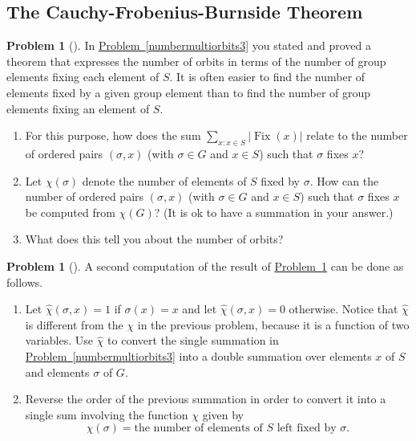 \documentclass[10pt,]{book}
\theoremstyle{plain}
\theoremstyle{definition}
\newtheorem{activity}[project]{Problem}
\theoremstyle{definition}
\numberwithin{equation}{chapter}
\DeclareMathOperator{\Fix}{Fix}
\begin{document}
\subsection[{The Cauchy-Frobenius-Burnside Theorem}]{The Cauchy-Frobenius-Burnside Theorem}\label{subsection-67}
\begin{activity}[] \label{numbermultiorbits4}
In \hyperref[numbermultiorbits3]{Problem~\ref{numbermultiorbits3}} you stated and proved a theorem that expresses the number of orbits in terms of the number of group elements fixing each element of \(S\). It is often easier to find the number of elements fixed by a given group element than to find the number of group elements fixing an element of \(S\).%
\begin{enumerate}[font=\bfseries,label=(\alph*),ref=\alph*]
\item\label{task-225} \marginsymbol[-2.5em]{} For this purpose, how does the sum \(\sum_{x\colon x\in S}|\Fix(x)|\) relate to the number of ordered pairs \((\sigma,x)\) (with \(\sigma\in G\) and \(x \in S\)) such that \(\sigma\) fixes \(x\)?%
\item\label{task-226} \marginsymbol[-2.5em]{} Let \(\chi(\sigma)\) denote the number of elements of \(S\) fixed by \(\sigma\). How can the number of ordered pairs \((\sigma,x)\) (with \(\sigma\in G\) and \(x\in S\)) such that \(\sigma\) fixes \(x\) be computed from \(\chi(G)\)? (It is ok to have a summation in your answer.)%
\item\label{task-227} \marginsymbol[-2.5em]{} What does this tell you about the number of orbits?%
\end{enumerate}
\end{activity}
\begin{activity}[]\marginsymbol[-1em]{} \label{numbermultiorbits5}
A second computation of the result of \hyperref[numbermultiorbits4]{Problem~\ref{numbermultiorbits4}} can be done as follows.%
\begin{enumerate}[font=\bfseries,label=(\alph*),ref=\alph*]
\item\label{task-228} \marginsymbol[-2.5em]{} Let \(\widehat{\chi}(\sigma,x)=1\) if \(\sigma(x)=x\) and let \(\widehat{\chi}(\sigma,x) =0\) otherwise.  Notice that \(\widehat{\chi}\) is different from the \(\chi\) in the previous problem, because it is a function of two variables. Use \(\widehat{\chi}\) to convert the single summation in \hyperref[numbermultiorbits3]{Problem~\ref{numbermultiorbits3}} into a double summation over elements \(x\) of \(S\) and elements \(\sigma\) of \(G\).%
\item\label{task-229} \marginsymbol[-2.5em]{} Reverse the order of the previous summation in order to convert it into a single sum involving the function \(\chi\) given by%
\begin{equation*}
\chi(\sigma) =
\mbox{the number of elements of \(S\) left fixed by \(\sigma\)} .
\end{equation*}
%
\end{enumerate}
\end{activity}
\end{document}
